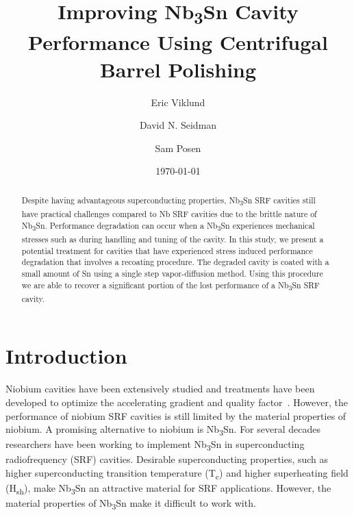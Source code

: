 \documentclass{revtex4-2}
\begin{document}
\title{Improving Nb\textsubscript{3}Sn Cavity Performance Using Centrifugal Barrel Polishing}
\author{Eric Viklund}
\author{David N. Seidman}
\author{Sam Posen}


\date{\today}

\begin{abstract}

    Despite having advantageous superconducting properties, Nb\textsubscript{3}Sn SRF cavities still have practical challenges compared to Nb SRF cavities due to the brittle nature of Nb\textsubscript{3}Sn. Performance degradation can occur when a Nb\textsubscript{3}Sn experiences mechanical stresses such as during handling and tuning of the cavity. In this study, we present a potential treatment for cavities that have experienced stress induced performance degradation that involves a recoating procedure. The degraded cavity is coated with a small amount of Sn using a single step vapor-diffusion method. Using this procedure we are able to recover a significant portion of the lost performance of a Nb\textsubscript{3}Sn SRF cavity.

\end{abstract}

\maketitle

\section{Introduction}
\label{sec:Introduction}

Niobium cavities have been extensively studied and treatments have been developed to optimize the accelerating gradient and quality factor~\cite{10.1063/1.4866013, 10.1063/1.4960801, 10.1063/5.0059464, 10.1063/5.0063379}. However, the performance of niobium SRF cavities is still limited by the material properties of niobium. A promising alternative to niobium is Nb\textsubscript{3}Sn. For several decades researchers have been working to implement Nb\textsubscript{3}Sn in superconducting radiofrequency (SRF) cavities.\cite{10.1063/1.4913617, 10.1063/1.4913247} Desirable superconducting properties, such as higher superconducting transition temperature (T\textsubscript{c}) and higher superheating field (H\textsubscript{sh})\cite{liarte2017theoretical, catelani2008temperature, lin2012effect, kubo2020superfluid}, make Nb\textsubscript{3}Sn an attractive material for SRF applications. However, the material properties of Nb\textsubscript{3}Sn make it difficult to work with. 
\end{document}
